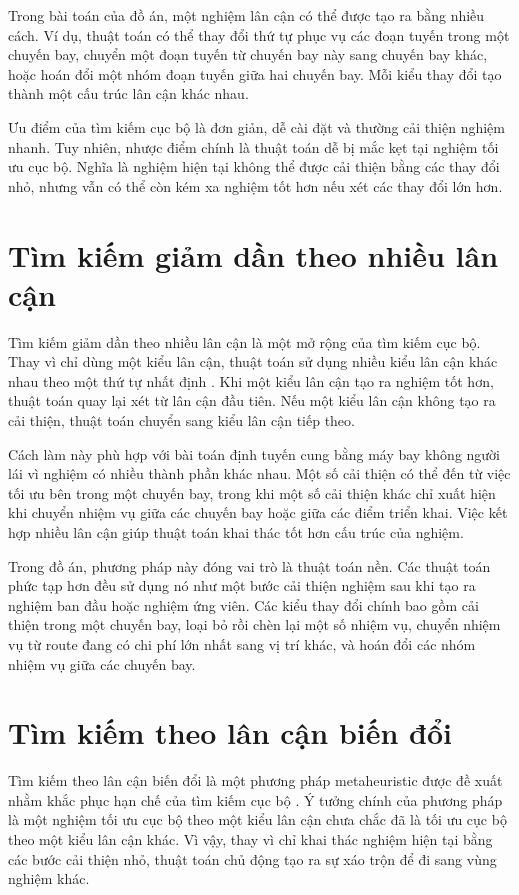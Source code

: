 Trong bài toán của đồ án, một nghiệm lân cận có thể được tạo ra bằng nhiều cách. Ví dụ, thuật toán có thể thay đổi thứ tự phục vụ các đoạn tuyến trong một chuyến bay, chuyển một đoạn tuyến từ chuyến bay này sang chuyến bay khác, hoặc hoán đổi một nhóm đoạn tuyến giữa hai chuyến bay. Mỗi kiểu thay đổi tạo thành một cấu trúc lân cận khác nhau.

Ưu điểm của tìm kiếm cục bộ là đơn giản, dễ cài đặt và thường cải thiện nghiệm nhanh. Tuy nhiên, nhược điểm chính là thuật toán dễ bị mắc kẹt tại nghiệm tối ưu cục bộ. Nghĩa là nghiệm hiện tại không thể được cải thiện bằng các thay đổi nhỏ, nhưng vẫn có thể còn kém xa nghiệm tốt hơn nếu xét các thay đổi lớn hơn.

\section{Tìm kiếm giảm dần theo nhiều lân cận}

Tìm kiếm giảm dần theo nhiều lân cận là một mở rộng của tìm kiếm cục bộ. Thay vì chỉ dùng một kiểu lân cận, thuật toán sử dụng nhiều kiểu lân cận khác nhau theo một thứ tự nhất định \cite{hansen2001vns}. Khi một kiểu lân cận tạo ra nghiệm tốt hơn, thuật toán quay lại xét từ lân cận đầu tiên. Nếu một kiểu lân cận không tạo ra cải thiện, thuật toán chuyển sang kiểu lân cận tiếp theo.

Cách làm này phù hợp với bài toán định tuyến cung bằng máy bay không người lái vì nghiệm có nhiều thành phần khác nhau. Một số cải thiện có thể đến từ việc tối ưu bên trong một chuyến bay, trong khi một số cải thiện khác chỉ xuất hiện khi chuyển nhiệm vụ giữa các chuyến bay hoặc giữa các điểm triển khai. Việc kết hợp nhiều lân cận giúp thuật toán khai thác tốt hơn cấu trúc của nghiệm.

Trong đồ án, phương pháp này đóng vai trò là thuật toán nền. Các thuật toán phức tạp hơn đều sử dụng nó như một bước cải thiện nghiệm sau khi tạo ra nghiệm ban đầu hoặc nghiệm ứng viên. Các kiểu thay đổi chính bao gồm cải thiện trong một chuyến bay, loại bỏ rồi chèn lại một số nhiệm vụ, chuyển nhiệm vụ từ route đang có chi phí lớn nhất sang vị trí khác, và hoán đổi các nhóm nhiệm vụ giữa các chuyến bay.

\section{Tìm kiếm theo lân cận biến đổi}

Tìm kiếm theo lân cận biến đổi là một phương pháp metaheuristic được đề xuất nhằm khắc phục hạn chế của tìm kiếm cục bộ \cite{mladenovic1997vns,hansen2010vns}. Ý tưởng chính của phương pháp là một nghiệm tối ưu cục bộ theo một kiểu lân cận chưa chắc đã là tối ưu cục bộ theo một kiểu lân cận khác. Vì vậy, thay vì chỉ khai thác nghiệm hiện tại bằng các bước cải thiện nhỏ, thuật toán chủ động tạo ra sự xáo trộn để đi sang vùng nghiệm khác.

